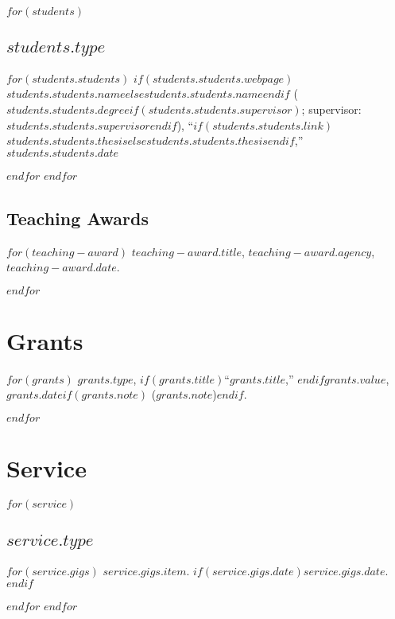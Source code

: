 \documentclass[11pt]{article}
\begin{document}
$for(students)$
\subsection{$students.type$}
$for(students.students)$
\ind
$if(students.students.webpage)$\href{$students.students.webpage$}{$students.students.name$}$else$$students.students.name$$endif$
($students.students.degree$$if(students.students.supervisor)$;
supervisor: $students.students.supervisor$$endif$),
``$if(students.students.link)$\href{$students.students.link$}{$students.students.thesis$}$else$$students.students.thesis$$endif$,''
$students.students.date$

$endfor$
$endfor$

\subsection{Teaching Awards}

$for(teaching-award)$
\ind $teaching-award.title$, $teaching-award.agency$, $teaching-award.date$.

$endfor$

\section{Grants}

$for(grants)$
\ind $grants.type$, $if(grants.title)$``$grants.title$,'' $endif$$grants.value$, $grants.date$$if(grants.note)$ ($grants.note$)$endif$.

$endfor$

\section{Service}

$for(service)$
\subsection{$service.type$}
$for(service.gigs)$
\ind $service.gigs.item$. $if(service.gigs.date)$$service.gigs.date$.$endif$

$endfor$
$endfor$
\end{document}
